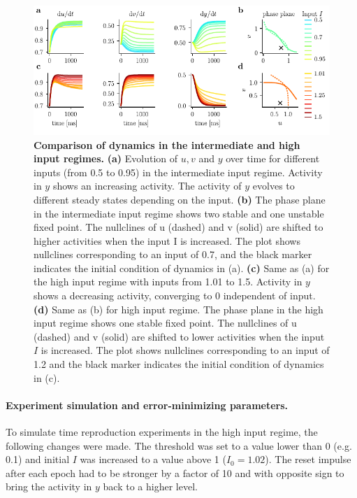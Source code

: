 \documentclass[10pt, a4paper]{article}
\begin{document}
\begin{figure}[ht]
	\centering
	\includegraphics{figures/supp_regimes.pdf}
	\caption{\textbf{Comparison of dynamics in the intermediate and high input regimes.} 
	\textbf{(a)} Evolution of $u, v$ and $y$ over time for different inputs (from 0.5 to 0.95) in the intermediate input regime. Activity in $y$ shows an increasing activity. The activity of $y$ evolves to different steady states depending on the input. 
	\textbf{(b)}  The phase plane in the intermediate input regime shows two stable and one unstable fixed point. The nullclines of u (dashed) and v (solid) are shifted to higher activities when the input I is increased. The plot shows nullclines corresponding to an input of 0.7, and the black marker indicates the initial condition of dynamics in (a).
	\textbf{(c)} Same as (a) for the high input regime with inputs from 1.01 to 1.5. Activity in $y$ shows a decreasing activity, converging to 0 independent of input.
	\textbf{(d)} Same as (b) for high input regime.  The phase plane in the high input
	regime shows one stable fixed point. The nullclines of u (dashed) and v (solid) are
	shifted to lower activities when the input $I$ is increased. The plot shows nullclines corresponding to an input of 1.2 and the black marker indicates the initial condition of dynamics in (c).
	}
\label{regimes}
\end{figure}

\paragraph{Experiment simulation and error-minimizing parameters.}
To simulate time reproduction experiments in the high input regime, the following changes were made. 
The threshold was set to a value lower than 0 (e.g. 0.1) and initial $I$ was increased to a value above 1 ($I_0 = 1.02$). The reset impulse after each epoch had to be stronger by a factor of 10 and with opposite sign to bring the activity in $y$ back to a higher level.
\end{document}
